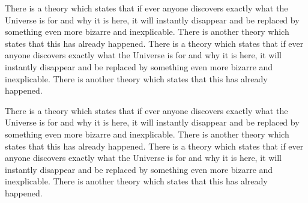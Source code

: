 \begin{multicols}{2}
    There is a theory which states that if ever anyone discovers 
    exactly what the Universe is for and why it is here, 
    it will instantly disappear and be replaced by something even more bizarre and inexplicable.
    There is another theory which states that this has already happened.
    There is a theory which states that if ever anyone discovers 
    exactly what the Universe is for and why it is here, 
    it will instantly disappear and be replaced by something even more bizarre and inexplicable.
    There is another theory which states that this has already happened.
\end{multicols}

\begin{multicols}{3}
    There is a theory which states that if ever anyone discovers 
    exactly what the Universe is for and why it is here, 
    it will instantly disappear and be replaced by something even more bizarre and inexplicable.
    There is another theory which states that this has already happened.
    There is a theory which states that if ever anyone discovers 
    exactly what the Universe is for and why it is here, 
    it will instantly disappear and be replaced by something even more bizarre and inexplicable.
    There is another theory which states that this has already happened.
\end{multicols}
